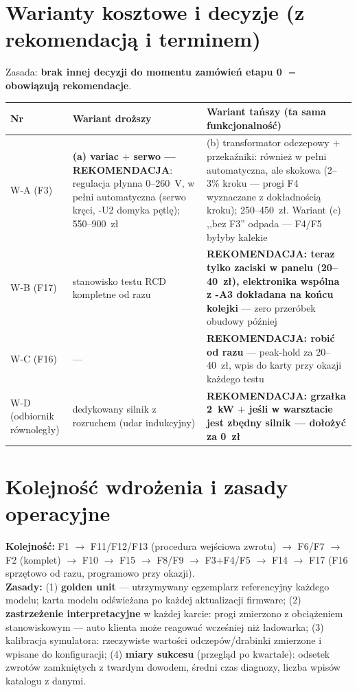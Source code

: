 \documentclass[11pt,a4paper]{article}
\begin{document}
\section{Warianty kosztowe i decyzje (z rekomendacją i terminem)}
\label{sec:warianty}
Zasada: \textbf{brak innej decyzji do momentu zamówień etapu 0 $=$ obowiązują rekomendacje}.
\begin{longtable}{@{}p{}p{}p{}@{}}
\toprule
\textbf{Nr} & \textbf{Wariant droższy} & \textbf{Wariant tańszy (ta sama funkcjonalność)}\\
\midrule
W-A (F3) & \textbf{(a) variac $+$ serwo --- REKOMENDACJA}: regulacja płynna 0--260~V, w pełni
automatyczna (serwo kręci, -U2 domyka pętlę); 550--900~zł & (b) transformator odczepowy
$+$ przekaźniki: również w pełni automatyczna, ale skokowa (2--3\% kroku --- progi F4 wyznaczane
z dokładnością kroku); 250--450~zł. Wariant (c) ,,bez F3'' odpada --- F4/F5 byłyby kalekie\\
W-B (F17) & stanowisko testu RCD kompletne od razu & \textbf{REKOMENDACJA: teraz tylko zaciski
w panelu (20--40~zł), elektronika wspólna z -A3 dokładana na końcu kolejki} --- zero przeróbek
obudowy później\\
W-C (F16) & --- & \textbf{REKOMENDACJA: robić od razu} --- peak-hold za 20--40~zł, wpis do karty
przy okazji każdego testu\\
W-D (odbiornik równoległy) & dedykowany silnik z rozruchem (udar indukcyjny) & \textbf{REKOMENDACJA:
grzałka 2~kW $+$ jeśli w warsztacie jest zbędny silnik --- dołożyć za 0~zł}\\
\bottomrule
\end{longtable}

\section{Kolejność wdrożenia i zasady operacyjne}
\textbf{Kolejność:} F1 $\to$ F11/F12/F13 (procedura wejściowa zwrotu) $\to$ F6/F7 $\to$ F2
(komplet) $\to$ F10 $\to$ F15 $\to$ F8/F9 $\to$ F3$+$F4/F5 $\to$ F14 $\to$ F17 (F16 sprzętowo od
razu, programowo przy okazji).\\
\textbf{Zasady:} (1) \textbf{golden unit} --- utrzymywany egzemplarz referencyjny każdego modelu;
karta modelu odświeżana po każdej aktualizacji firmware; (2) \textbf{zastrzeżenie interpretacyjne}
w każdej karcie: progi zmierzono z obciążeniem stanowiskowym --- auto klienta może reagować
wcześniej niż ładowarka; (3) kalibracja symulatora: rzeczywiste wartości odczepów/drabinki
zmierzone i wpisane do konfiguracji; (4) \textbf{miary sukcesu} (przegląd po kwartale): odsetek
zwrotów zamkniętych z twardym dowodem, średni czas diagnozy, liczba wpisów katalogu z danymi.
\end{document}
